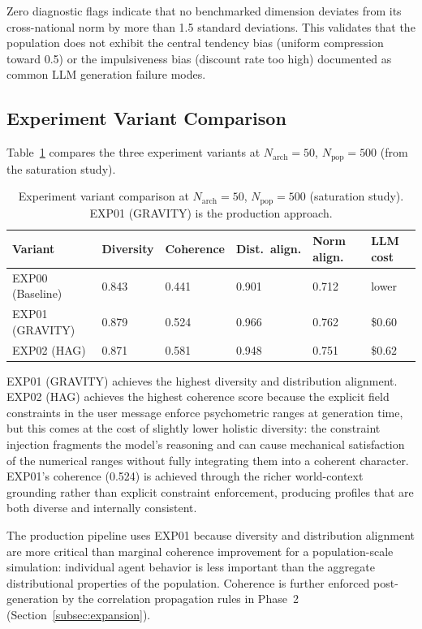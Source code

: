 \documentclass[sustainability,article,submit,pdftex,moreauthors]{Definitions/mdpi}
\begin{document}
Zero diagnostic flags indicate that no benchmarked dimension deviates
from its cross-national norm by more than 1.5 standard deviations. This
validates that the population does not exhibit the central tendency bias
(uniform compression toward 0.5) or the impulsiveness bias (discount rate
too high) documented as common LLM generation failure modes.

\subsection{Experiment Variant Comparison}
\label{subsec:variant_comparison}

Table~\ref{tab:exp_comparison} compares the three experiment variants
at $N_\text{arch} = 50$, $N_\text{pop} = 500$ (from the saturation study).

\begin{table}[H]
\caption{Experiment variant comparison at $N_\text{arch} = 50$,
$N_\text{pop} = 500$ (saturation study). EXP01 (GRAVITY) is the
production approach.}
\label{tab:exp_comparison}
\begin{tabularx}{\textwidth}{lXXXXX}
\toprule
\textbf{Variant}  & \textbf{Diversity} & \textbf{Coherence}
                  & \textbf{Dist.\ align.} & \textbf{Norm align.}
                  & \textbf{LLM cost} \\
\midrule
EXP00 (Baseline) & 0.843 & 0.441 & 0.901 & 0.712 & lower \\
EXP01 (GRAVITY)  & 0.879 & 0.524 & 0.966 & 0.762 & \$$0.60$ \\
EXP02 (HAG)      & 0.871 & 0.581 & 0.948 & 0.751 & \$$0.62$ \\
\bottomrule
\end{tabularx}
\end{table}

EXP01 (GRAVITY) achieves the highest diversity and distribution alignment.
EXP02 (HAG) achieves the highest coherence score because the explicit
field constraints in the user message enforce psychometric ranges at
generation time, but this comes at the cost of slightly lower holistic
diversity: the constraint injection fragments the model's reasoning
and can cause mechanical satisfaction of the numerical ranges without
fully integrating them into a coherent character. EXP01's coherence
(0.524) is achieved through the richer world-context grounding rather
than explicit constraint enforcement, producing profiles that are both
diverse and internally consistent.

The production pipeline uses EXP01 because diversity and distribution
alignment are more critical than marginal coherence improvement for
a population-scale simulation: individual agent behavior is less
important than the aggregate distributional properties of the population.
Coherence is further enforced post-generation by the correlation
propagation rules in Phase~2 (Section~\ref{subsec:expansion}).
\end{document}
